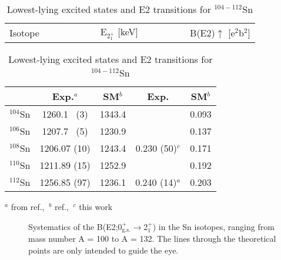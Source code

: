 \documentclass[aps,prc,twocolumn,amssymb,showpacs]{revtex4}
\begin{document}
\begin{table}[!h]
\caption{Lowest-lying excited states and E2 transitions for
$^{104-112}$Sn}\label{tab-2}
\begin{tabular}[t]{lcccc}
\hline \hline
\vspace{5pt}
Isotope~~~~~~~~~& & E$_{2^{+}_{1}}$ [keV] & ~~~~~~~& B(E2)$\uparrow$ [e$^2$b$^2$]   \\
\end{tabular}
\begin{tabular}{ccccc}
           & Exp.$^a$ & SM$^b$ & Exp. & SM$^b$   \\
\hline \hline
$^{104}$Sn & 1260.1~ (3) & 1343.4 & & 0.093   \\
$^{106}$Sn & 1207.7~ (5) & 1230.9 & & 0.137   \\
$^{108}$Sn & 1206.07 (10) & 1243.4 & 0.230 (50)$^c$ & 0.171   \\
$^{110}$Sn & 1211.89 (15) & 1252.9 & & 0.192  \\
$^{112}$Sn & 1256.85 (97) & 1236.1 & 0.240 (14)$^a$ & 0.203   \\
\hline \hline
\end{tabular}
\end{table} $^a$ from ref.\cite{ram01},$\ $
 $^b$ ref.\cite{hjo05},$\ $
 $^c$ this work
\vspace{-5pt}
\begin{figure}[hhh]\hspace{-0.5cm}
\centering\mbox{}
\caption{\small Systematics of the
B(E2;0$^{+}_{\text{g.s.}}$$\rightarrow$2$^{+}_{1}$) in the Sn
isotopes, ranging from mass number A = 100 to A = 132. The lines
through the theoretical points are only intended to guide the
eye.}\label{fig:systematics}
\end{figure}
\end{document}
